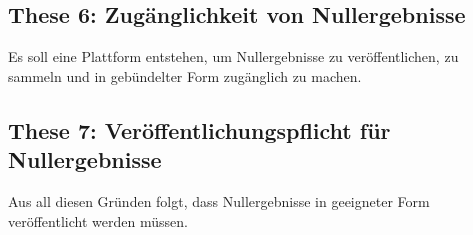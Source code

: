 \documentclass[DIV=9]{scrartcl}
\begin{document}
\subsection*{These 6: Zugänglichkeit von Nullergebnisse}
Es soll eine Plattform entstehen, um Nullergebnisse zu veröffentlichen, zu sammeln und in gebündelter Form zugänglich zu machen.

\subsection*{These 7: Veröffentlichungspflicht für Nullergebnisse}
Aus all diesen Gründen folgt, dass Nullergebnisse in geeigneter Form veröffentlicht werden müssen.
\end{document}
